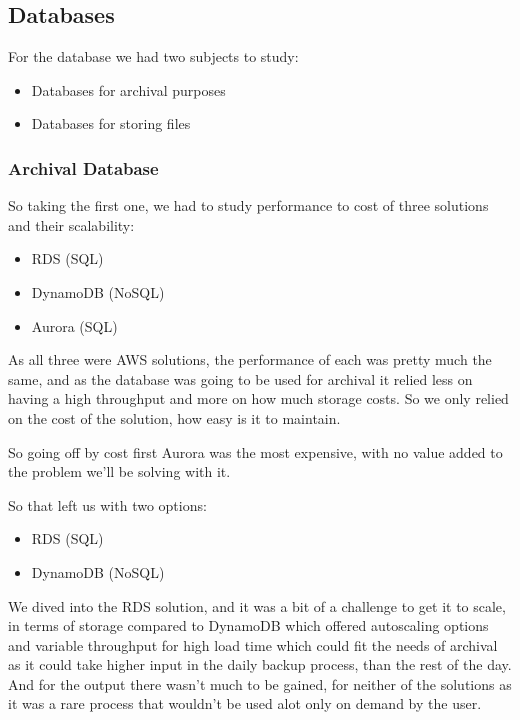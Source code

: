 \subsection {Databases}

For the database we had two subjects to study:
\begin{itemize}
        \item Databases for archival purposes
        \item Databases for storing files
    \end{itemize}

\subsubsection {Archival Database}

So taking the first one, we had to study performance to cost of three solutions and their scalability:

    \begin{itemize}
        \item RDS (SQL)
        \item DynamoDB (NoSQL)
        \item Aurora (SQL)
    \end{itemize}

As all three were AWS solutions, the performance of each was pretty much the same,
and as the database was going to be used for archival it relied less on having a
high throughput and more on how much storage costs.
So we only relied on the cost of the solution, how easy is it to maintain.

So going off by cost first Aurora was the most expensive, with no value added to the problem we'll be solving with it.

So that left us with two options:

    \begin{itemize}
        \item RDS (SQL)
        \item DynamoDB (NoSQL)
    \end{itemize}

We dived into the RDS solution, and it was a bit of a challenge to get it to scale,
in terms of storage compared to DynamoDB which offered autoscaling options and variable
throughput for high load time which could fit the needs of archival as it could take 
higher input in the daily backup process, than the rest of the day.
And for the output there wasn't much to be gained, for neither of the solutions as it was
a rare process that wouldn't be used alot only on demand by the user.

